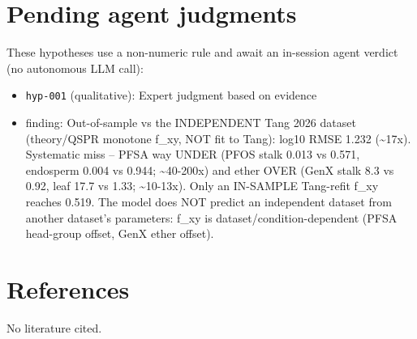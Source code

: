 \documentclass{article}
\begin{document}
\section{Pending agent judgments}
These hypotheses use a non-numeric rule and await an in-session agent verdict (no autonomous LLM call):
\begin{itemize}
  \item \texttt{hyp-001} (qualitative): Expert judgment based on evidence
  \item finding: Out-of-sample vs the INDEPENDENT Tang 2026 dataset (theory/QSPR monotone f\_xy, NOT fit to Tang): log10 RMSE 1.232 (\textasciitilde{}17x). Systematic miss -- PFSA way UNDER (PFOS stalk 0.013 vs 0.571, endosperm 0.004 vs 0.944; \textasciitilde{}40-200x) and ether OVER (GenX stalk 8.3 vs 0.92, leaf 17.7 vs 1.33; \textasciitilde{}10-13x). Only an IN-SAMPLE Tang-refit f\_xy reaches 0.519. The model does NOT predict an independent dataset from another dataset's parameters: f\_xy is dataset/condition-dependent (PFSA head-group offset, GenX ether offset).
\end{itemize}

\section{References}
No literature cited.
\end{document}
